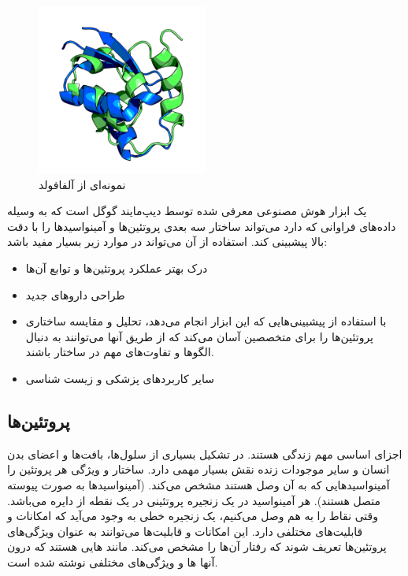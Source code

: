 \documentclass[10pt, a4paper]{article}
\begin{document}
\begin{figure}[H]
    \centering
    \includegraphics[width=0.5\textwidth]{images/sample_alphafold.png}
    \caption{نمونه‌ای از آلفافولد}
    \label{fig: alphafold}
\end{figure}

یک ابزار هوش مصنوعی معرفی شده توسط دیپ‌مایند گوگل است که به وسیله داده‌های
فراوانی که دارد می‌تواند ساختار سه بعدی پروتئین‌ها و آمینواسید‌ها را با دقت بالا
پیشبینی کند. استفاده از آن می‌تواند در موارد زیر بسیار مفید باشد:

\begin{itemize}
    \item درک بهتر عملکرد پروتئین‌ها و توابع آن‌ها
    \item طراحی دارو‌های جدید
    \item با استفاده از پیشبینی‌هایی که این ابزار انجام می‌دهد، تحلیل و مقایسه
    ساختاری پروتئین‌ها را برای متخصصین آسان می‌کند که از طریق آنها می‌توانند به
    دنبال الگو‌ها و تفاوت‌های مهم در ساختار باشند.
    \item سایر کاربرد‌های پزشکی و زیست شناسی 
\end{itemize}

\subsection{پروتئین‌ها}

اجزای اساسی مهم زندگی هستند. در تشکیل بسیاری از سلول‌ها، بافت‌ها و اعضای بدن
انسان و سایر موجودات زنده نقش بسیار مهمی دارد. ساختار و ویژگی هر پروتئین را
آمینواسید‌هایی که به آن وصل هستند مشخص می‌کند. (آمینواسید‌ها به صورت پیوسته متصل
هستند). هر آمینواسید در یک زنجیره پروتئینی در یک نقطه از دایره می‌باشد. وقتی
نقاط را به هم وصل می‌کنیم، یک زنجیره خطی به وجود می‌آید که امکانات و قابلیت‌های
مختلفی دارد. این امکانات و قابلیت‌ها می‌توانند به عنوان ویژگی‌های پروتئین‌ها
تعریف شوند که رفتار آن‌ها را مشخص می‌کند. مانند هایی هستند که درون
آنها ها و ویژگی‌های مختلفی نوشته شده است.
\end{document}
